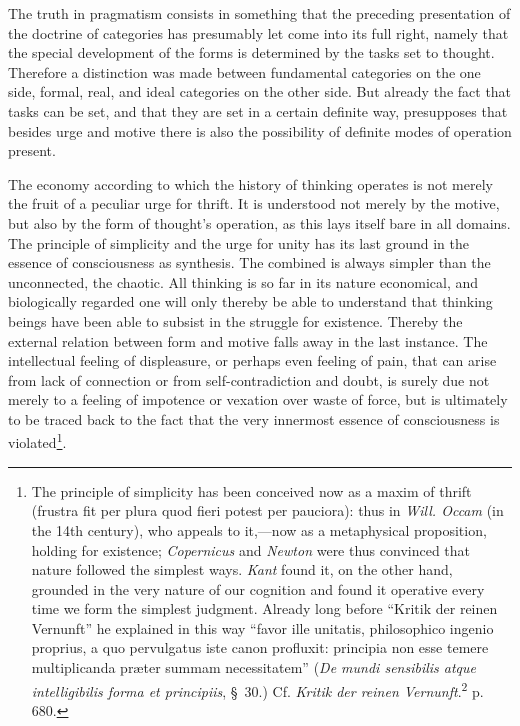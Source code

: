 \documentclass[12pt,a4paper]{book}
\newcommand{\opage}[1]{\marginnote{\footnotesize\textit{[#1]}}}
\begin{document}
The truth in pragmatism consists in something that the preceding presentation of
the doctrine of categories has presumably let come into its full right, namely
that the special development of the forms is determined by the tasks set to
thought. Therefore a distinction was made between fundamental categories on the
one side, formal, real, and ideal categories on the other side. But already the
fact that tasks can be set, and that they are set in a certain definite way,
presupposes that besides urge and motive there is also the possibility of
definite modes of operation present.

The economy according to which the history of thinking operates is not merely
the fruit of a peculiar urge for thrift. It is understood not merely by the
motive, but also by the form of thought's operation, as this lays itself bare
in all domains. The principle of simplicity and the urge for unity has its last
ground in the essence of consciousness as synthesis. The combined is always
simpler than the unconnected, the chaotic. All thinking is so far in its nature
economical, and biologically regarded one will only thereby be able to
understand that thinking beings have been able to subsist in the struggle for
existence. Thereby the external relation between form and motive falls away in
the last instance. The intellectual feeling of displeasure, or perhaps even
feeling of pain, that can arise from lack of connection or from
self-contradiction and doubt, is surely due not merely to a feeling of
impotence \opage{272}or vexation over waste of force, but is ultimately to be traced back
to the fact that the very innermost essence of consciousness is
violated\footnote{The principle of simplicity has been conceived now as a
maxim of thrift (frustra fit per plura quod fieri potest per pauciora): thus in
\emph{Will. Occam} (in the 14th century), who appeals to it,---now as a
metaphysical proposition, holding for existence; \emph{Copernicus} and
\emph{Newton} were thus convinced that nature followed the simplest ways.
\emph{Kant} found it, on the other hand, grounded in the very nature of our
cognition and found it operative every time we form the simplest judgment.
Already long before ``Kritik der reinen Vernunft'' he explained in this way
``favor ille unitatis, philosophico ingenio proprius, a quo pervulgatus iste
canon profluxit: principia non esse temere multiplicanda præter summam
necessitatem'' (\emph{De mundi sensibilis atque intelligibilis forma et
principiis}, \S\ 30.) Cf. \emph{Kritik der reinen Vernunft}.\textsuperscript{2}
p. 680.}.
\end{document}
